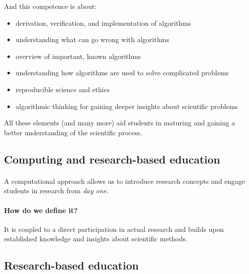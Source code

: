 \documentclass[%
oneside,                 %
final,                   %
10pt]{article}
\begin{document}
And this  competence is about:

\begin{itemize}
\item derivation, verification, and implementation of algorithms

\item understanding what can go wrong with algorithms

\item overview of important, known algorithms

\item understanding how algorithms are used to solve complicated problems

\item reproducible science and ethics

\item algorithmic thinking for gaining deeper insights about scientific problems
\end{itemize}

\noindent
All these elements (and many more) aid students in maturing and gaining a better understanding of the scientific process.







\subsection{Computing and research-based education}

\paragraph{}
A computational approach allows us to introduce research concepts and engage students in research from \emph{day one}.



\paragraph{How do we define it?}
It is coupled to a direct participation in actual research and builds upon established
knowledge and insights about scientific methods.





\subsection{Research-based education}
\end{document}
